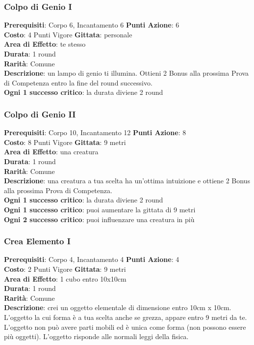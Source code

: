 \documentclass[12pt,a4paper,twoside,openany]{book}
\begin{document}
\begin{multicols}{2}
\subsubsection*{Colpo di Genio I}
\textbf{Prerequisiti}: Corpo 6, Incantamento 6
\textbf{Punti Azione}: 6\\
\textbf{Costo}: 4 Punti Vigore
\textbf{Gittata}: personale\\
\textbf{Area di Effetto}: te stesso\\
\textbf{Durata}: 1 round\\
\textbf{Rarità}: Comune\\
\textbf{Descrizione}: un lampo di genio ti illumina. 
Ottieni 2 Bonus alla prossima Prova di Competenza entro la fine del round successivo.\\
\textbf{Ogni 1 successo critico}: la durata diviene 2 round

\subsubsection*{Colpo di Genio II}
\textbf{Prerequisiti}: Corpo 10, Incantamento 12
\textbf{Punti Azione}: 8\\
\textbf{Costo}: 8 Punti Vigore
\textbf{Gittata}: 9 metri\\
\textbf{Area di Effetto}: una creatura\\
\textbf{Durata}: 1 round\\
\textbf{Rarità}: Comune\\
\textbf{Descrizione}: una creatura a tua scelta ha un'ottima intuizione e ottiene 2 Bonus alla prossima Prova di Competenza.\\
\textbf{Ogni 1 successo critico}: la durata diviene 2 round\\
\textbf{Ogni 1 successo critico}: puoi aumentare la gittata di 9 metri\\
\textbf{Ogni 2 successo critico}: puoi influenzare una creatura in più


\subsubsection*{Crea Elemento I}
\textbf{Prerequisiti}: Corpo 4, Incantamento 4
\textbf{Punti Azione}: 4\\
\textbf{Costo}: 2 Punti Vigore
\textbf{Gittata}: 9 metri\\
\textbf{Area di Effetto}: 1 cubo entro 10x10cm\\
\textbf{Durata}: 1 round\\
\textbf{Rarità}: Comune\\
\textbf{Descrizione}: crei un oggetto elementale di dimensione entro 10cm x 10cm.
L'oggetto la cui forma è a tua scelta anche se grezza, appare entro 9 metri da te. 
L'oggetto non può avere parti mobili ed è unica come forma (non possono essere più oggetti). L'oggetto risponde alle normali leggi della fisica.


\end{multicols}
\end{document}
